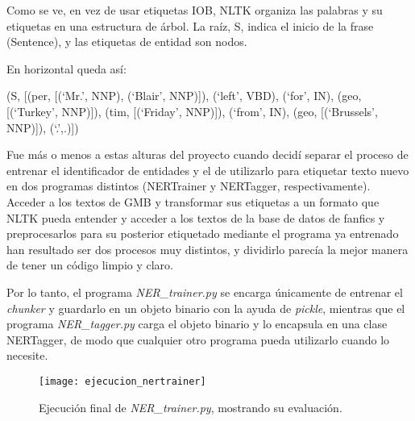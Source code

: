 \documentclass{pre-tfg}
\begin{document}
Como se ve, en vez de usar etiquetas IOB, NLTK organiza las palabras y su etiquetas en una estructura de árbol. La raíz, S, indica el inicio de la frase (Sentence), y las etiquetas de entidad son nodos.

En horizontal queda así:

(S, [(per, [(‘Mr.’, NNP), (‘Blair’, NNP)]), (‘left’, VBD), (‘for’, IN), (geo, [(‘Turkey’, NNP)]), (tim, [(‘Friday’, NNP)]), (‘from’, IN), (geo, [(‘Brussels’, NNP)]), (‘.’,.)])

Fue más o menos a estas alturas del proyecto cuando decidí separar el proceso de entrenar el identificador de entidades y el de utilizarlo para etiquetar texto nuevo en dos programas distintos (NERTrainer y NERTagger, respectivamente). Acceder a los textos de GMB y transformar sus etiquetas a un formato que NLTK pueda entender y acceder a los textos de la base de datos de fanfics y preprocesarlos para su posterior etiquetado mediante el programa ya entrenado han resultado ser dos procesos muy distintos, y dividirlo parecía la mejor manera de tener un código limpio y claro.

Por lo tanto, el programa \textit{NER\_trainer.py} se encarga únicamente de entrenar el \textit{chunker} y guardarlo en un objeto binario con la ayuda de \textit{pickle}, mientras que el programa \textit{NER\_tagger.py} carga el objeto binario y lo encapsula en una clase NERTagger, de modo que cualquier otro programa pueda utilizarlo cuando lo necesite.

\begin{figure}
	\centering
	\texttt{[image: ejecucion\_nertrainer]}
	\caption{Ejecución final de \textit{NER\_trainer.py}, mostrando su evaluación.}
	\label{fig:ner_evaluation}
\end{figure}
\end{document}
